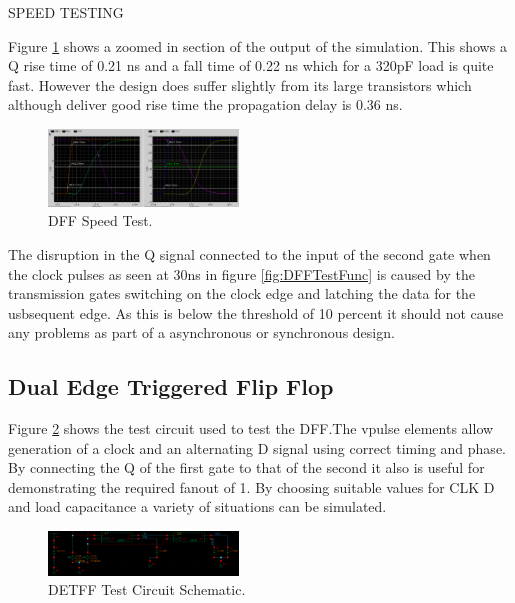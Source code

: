 SPEED TESTING

Figure \ref{fig:DFFTestSpeed} shows a zoomed in section of the output of the simulation. This shows a Q rise time of 0.21 ns and a fall time of 0.22 ns which for a 320pF load is quite fast. However the design does suffer slightly from its large transistors which although deliver good rise time the propagation delay is 0.36 ns.

\begin{figure}[h]  
\centering
   \includegraphics[width=0.45\textwidth]{Figures/DFFTestSpeed.png}
\caption{DFF Speed Test.}
\label {fig:DFFTestSpeed}
\end{figure}

The disruption in the Q signal connected to the input of the second gate when the clock pulses as seen at 30ns in figure \ref{fig:DFFTestFunc} is caused by the transmission gates switching on the clock edge and latching the data for the usbsequent edge. As this is below the threshold of 10 percent it should not cause any problems as part of a asynchronous or synchronous design.


\subsection{Dual Edge Triggered Flip Flop}

Figure \ref{fig:DETFFTestSchem} shows the test circuit used to test the DFF.The vpulse elements allow generation of a clock and an alternating D signal using correct timing and phase. By connecting the Q of the first gate to that of the second it also is useful for demonstrating the required fanout of 1. By choosing suitable values for CLK D and load capacitance a variety of situations can be simulated.

\begin{figure}[h]  
\centering
   \includegraphics[width=0.45\textwidth]{Figures/DETFFTestSchem.png}
\caption{DETFF Test Circuit Schematic.}
\label {fig:DETFFTestSchem}
\end{figure}

